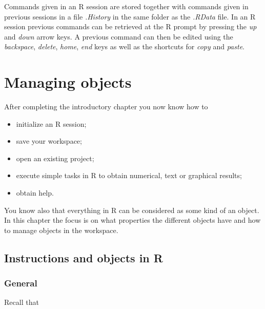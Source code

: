 \documentclass[
]{book}
\providecommand{\tightlist}{%
  \setlength{\itemsep}{0pt}\setlength{\parskip}{0pt}}
\begin{document}
Commands given in an R session are stored together with commands given in previous sessions in a file \emph{{.History}} in the same folder as the \emph{{.RData}} file. In an R session previous commands can be retrieved at the R prompt by pressing the \emph{up} and \emph{down} arrow keys. A previous command can then be edited using the \emph{backspace}, \emph{delete}, \emph{home}, \emph{end} keys as well as the shortcuts for \emph{copy} and \emph{paste}.

\chapter{Managing objects}\label{objects}

After completing the introductory chapter you now know how to

\begin{itemize}
\tightlist
\item
  initialize an R session;
\item
  save your workspace;
\item
  open an existing project;
\item
  execute simple tasks in R to obtain numerical, text or graphical results;
\item
  obtain help.
\end{itemize}

You know also that everything in R can be considered as some kind of an object. In this chapter the focus is on what properties the different objects have and how to manage objects in the workspace.

\section{Instructions and objects in R}\label{instructions-and-objects-in-r}

\subsection{General}\label{general}

Recall that
\end{document}
